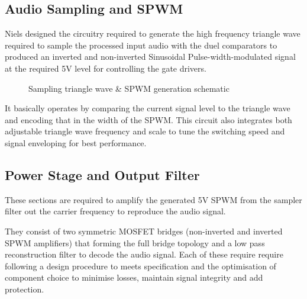 \documentclass[11pt]{article}
\begin{document}
{\subsection{Audio Sampling and SPWM}

Niels designed the circuitry required to generate the high frequency triangle wave required to sample the processed input audio with the duel comparators to produced an inverted and non-inverted Sinusoidal Pulse-width-modulated signal at the required 5V level for controlling the gate drivers.    

\begin{figure}[h!]
  \centering
  \caption{Sampling triangle wave \& SPWM generation schematic}
  \label{F:sample_schem}
\end{figure}

It basically operates by comparing the current signal level to the triangle wave and encoding that in the width of the SPWM. This circuit also integrates both adjustable triangle wave frequency and scale to tune the switching speed and signal enveloping for best performance.

\newpage
\subsection{Power Stage and Output Filter}

These sections are required to amplify the generated 5V SPWM from the sampler filter out the carrier frequency to reproduce the audio signal. 

They consist of two symmetric MOSFET bridges (non-inverted and inverted SPWM amplifiers) that forming the full bridge topology and a low pass reconstruction filter to decode the audio signal.
Each of these require require following a design procedure to meets specification and the optimisation of component choice to minimise losses, maintain signal integrity and add protection.

}
\end{document}

